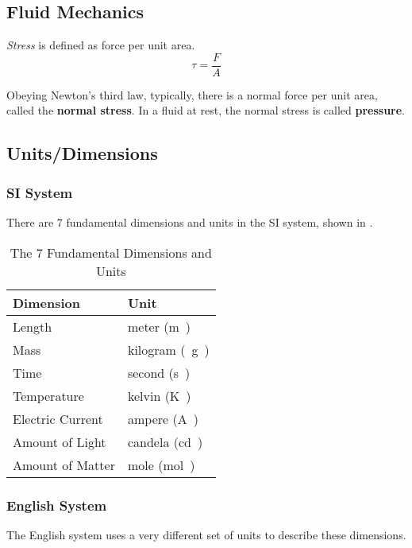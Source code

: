 \subsection{Fluid Mechanics}\label{subsec:Fluid_Mechanics}
\begin{definition}[Stress]\label{def:Stress}
  \emph{Stress} is defined as force per unit area.
  \begin{equation}\label{eq:Stress}
    \tau = \frac{F}{A}
  \end{equation}
\end{definition}

Obeying Newton's third law, typically, there is a normal force per unit area, called the \textbf{normal stress}.
In a fluid at rest, the normal stress is called \textbf{pressure}.

\subsection{Units/Dimensions}\label{subsec:Units_Dimensions}
\subsubsection{SI System}\label{subsubsec:SI_System}
There are 7 fundamental dimensions and units in the SI system, shown in .
\begin{table}[h!tbp]
  \centering
  \begin{tabular}{ll}
    \toprule
    Dimension & Unit \\
    \midrule
    Length & meter (\si{\meter{}}) \\
    Mass & kilogram (\si{\kilo{} \gram{}}) \\
    Time & second (\si{\second{}}) \\
    Temperature & kelvin (\si{\kelvin{}}) \\
    Electric Current & ampere (\si{\ampere{}}) \\
    Amount of Light & candela (\si{\candela{}}) \\
    Amount of Matter & mole (\si{\mole{}}) \\
    \bottomrule
  \end{tabular}
  \caption{The 7 Fundamental Dimensions and Units}
  \label{tab:7_Fundamental_Dimensions}
\end{table}

\subsubsection{English System}\label{subsubsec:English_System}
The English system uses a very different set of units to describe these dimensions.

